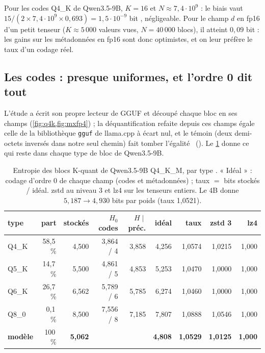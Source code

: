 Pour les codes Q4\_K de Qwen3.5-9B, $K = 16$ et $N \approx 7{,}4\cdot10^{9}$ : le biais vaut $15/(2 \times 7{,}4\cdot10^{9} \times 0{,}693) = 1{,}5\cdot10^{-9}$ bit \calc, négligeable. Pour le champ $d$ en fp16 d'un petit tenseur ($K \approx 5\,000$ valeurs vues, $N = 40\,000$ blocs), il atteint $0{,}09$ bit \calc : les gains sur les métadonnées en fp16 sont donc optimistes, et on leur préfère le taux d'un codage réel.

\subsection{Les codes : presque uniformes, et l'ordre 0 dit tout}

L'étude a écrit son propre lecteur de GGUF et découpé chaque bloc en ses champs (\cref{fig:q4k,fig:mxfp4}) ; la déquantification refaite depuis ces champs égale celle de la bibliothèque \texttt{gguf} de llama.cpp à écart nul, et le témoin (deux demi-octets inversés dans notre seul chemin) fait tomber l'égalité \mes~(). Le \cref{tab:ent-k} donne ce qui reste dans chaque type de bloc de Qwen3.5-9B.

\begin{table}[ht]
\centering\small
\caption[Entropie des blocs K-quant de Qwen3.5-9B]{Entropie des blocs K-quant de Qwen3.5-9B Q4\_K\_M, par type \mes. « Idéal » : codage d'ordre 0 de chaque champ (codes et métadonnées) ; taux $=$ bits stockés / idéal. zstd au niveau 3 et lz4 sur les tenseurs entiers. Le 4B donne $5{,}187 \to 4{,}930$ bits par poids (taux 1,0521).}
\label{tab:ent-k}
\begin{tabular}{@{}lrrrrrrrr@{}}
\toprule
type & part & stockés & $H_0$ codes & $H \mid$ préc. & idéal & taux & zstd 3 & lz4 \\
\midrule
Q4\_K & 58,5\,\% & 4,500 & 3,864 / 4 & 3,858 & 4,256 & 1,0574 & 1,0215 & 1,000 \\
Q5\_K & 14,7\,\% & 5,500 & 4,861 / 5 & 4,853 & 5,253 & 1,0470 & 1,0000 & 1,000 \\
Q6\_K & 26,7\,\% & 6,562 & 5,789 / 6 & 5,785 & 6,274 & 1,0460 & 1,0000 & 1,000 \\
Q8\_0 & 0,1\,\% & 8,500 & 7,556 / 8 & 7,185 & 7,807 & 1,0888 & 1,0546 & 1,000 \\
\midrule
\textbf{modèle} & 100\,\% & \textbf{5,062} & & & \textbf{4,808} & \textbf{1,0529} & \textbf{1,0125} & \textbf{1,000} \\
\bottomrule
\end{tabular}
\end{table}


